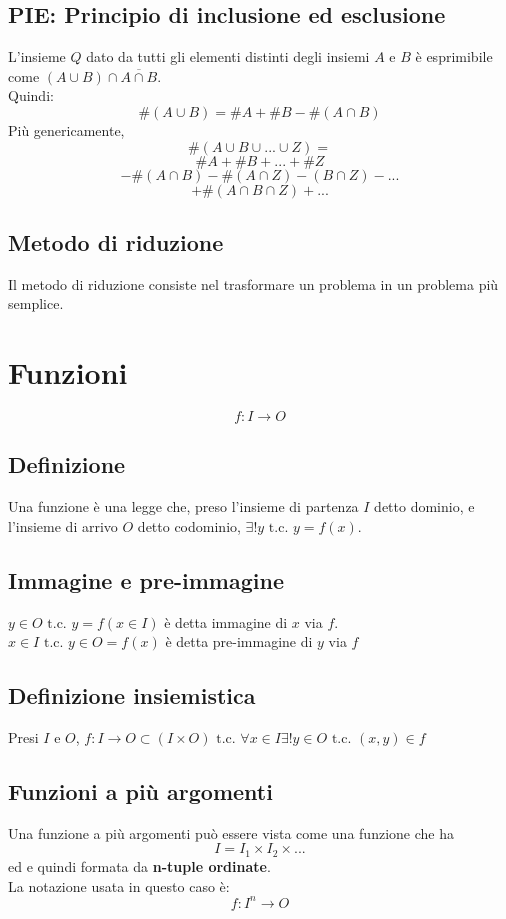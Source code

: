 \documentclass{report}
\begin{document}
    \subsection{PIE: Principio di inclusione ed esclusione}
        L'insieme $Q$ dato da tutti gli elementi distinti degli insiemi $A$ e $B$
        è esprimibile come $(A \cup B) \cap \overline{A \cap B}$. \\
        Quindi:
        $$\#\left(A \cup B\right) = \#A + \#B - \#\left(A \cap B\right)$$
        Più genericamente,
        $$\#\left(A \cup B \cup ... \cup Z\right) = $$
        $$\#A + \#B + ... + \#Z$$
        $$ - \#\left(A \cap B\right) - \#\left(A \cap Z\right) - \left(B \cap Z\right) - ... $$
        $$ + \#\left(A \cap B \cap Z\right) + ... $$
    \subsection{Metodo di riduzione}
        Il metodo di riduzione consiste nel trasformare un problema in un problema
        più semplice.
\section{Funzioni}
    $$ f: I \longrightarrow O $$
    \subsection{Definizione}
        Una funzione è una legge che, preso l'insieme di partenza $I$ detto dominio, e 
        l'insieme di arrivo $O$ detto codominio, $\exists!y \textrm{ t.c. } y = f\left(x\right)$.
    \subsection{Immagine e pre-immagine}
        $y \in O \textrm{ t.c. } y = f\left(x \in I\right)$ è detta immagine di $x$ via $f$. \\
        $x \in I \textrm{ t.c. } y \in O = f\left(x\right)$ è detta pre-immagine di $y$ via $f$
    \subsection{Definizione insiemistica}
        Presi $I$ e $O$, $f: I \longrightarrow O \subset (I \times O) \textrm { t.c. }
        \forall x \in I \exists! y \in O \textrm{ t.c. } \left(x,y\right) \in f$ \\
    \subsection{Funzioni a più argomenti}
        Una funzione a più argomenti può essere vista come una funzione che ha 
        $$I = I_1 \times I_2 \times ...$$
        ed e quindi formata da \textbf{n-tuple ordinate}. \\
        La notazione usata in questo caso è:
        $$f: I^n \longrightarrow O$$
\end{document}
